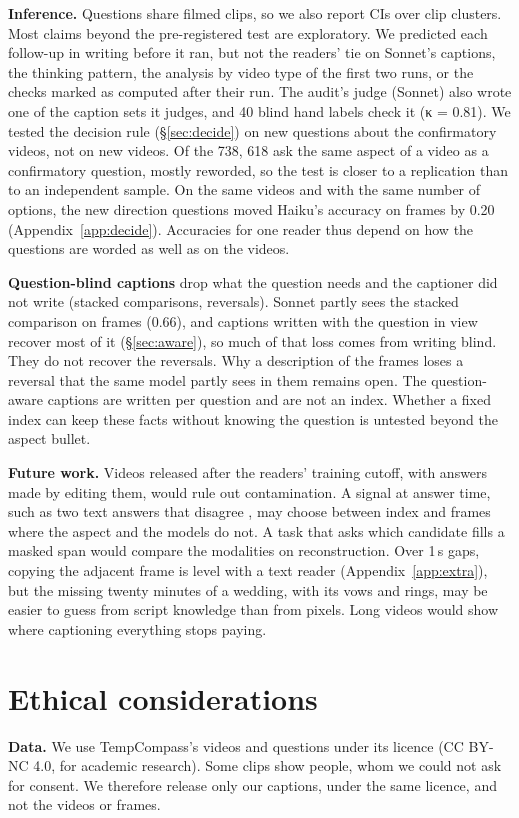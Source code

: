 \documentclass[11pt]{article}
\begin{document}
\textbf{Inference.} Questions share filmed clips, so we also report CIs over clip clusters. Most claims beyond the pre-registered test are exploratory. We predicted each follow-up in writing before it ran, but not the readers' tie on Sonnet's captions, the thinking pattern, the analysis by video type of the first two runs, or the checks marked as computed after their run. The audit's judge (Sonnet) also wrote one of the caption sets it judges, and 40 blind hand labels check it (κ = 0.81). We tested the decision rule (\S\ref{sec:decide}) on new questions about the confirmatory videos, not on new videos. Of the 738, 618 ask the same aspect of a video as a confirmatory question, mostly reworded, so the test is closer to a replication than to an independent sample. On the same videos and with the same number of options, the new direction questions moved Haiku's accuracy on frames by 0.20 (Appendix~\ref{app:decide}). Accuracies for one reader thus depend on how the questions are worded as well as on the videos.

\textbf{Question-blind captions} drop what the question needs and the captioner did not write (stacked comparisons, reversals). Sonnet partly sees the stacked comparison on frames (0.66), and captions written with the question in view recover most of it (\S\ref{sec:aware}), so much of that loss comes from writing blind. They do not recover the reversals. Why a description of the frames loses a reversal that the same model partly sees in them remains open. The question-aware captions are written per question and are not an index. Whether a fixed index can keep these facts without knowing the question is untested beyond the aspect bullet.

\textbf{Future work.} Videos released after the readers' training cutoff, with answers made by editing them, would rule out contamination. A signal at answer time, such as two text answers that disagree \citep{readfirst}, may choose between index and frames where the aspect and the models do not. A task that asks which candidate fills a masked span would compare the modalities on reconstruction. Over 1\,s gaps, copying the adjacent frame is level with a text reader (Appendix~\ref{app:extra}), but the missing twenty minutes of a wedding, with its vows and rings, may be easier to guess from script knowledge than from pixels. Long videos would show where captioning everything stops paying.

\section*{Ethical considerations}
\textbf{Data.} We use TempCompass's videos and questions under its licence (CC BY-NC 4.0, for academic research). Some clips show people, whom we could not ask for consent. We therefore release only our captions, under the same licence, and not the videos or frames.
\end{document}
